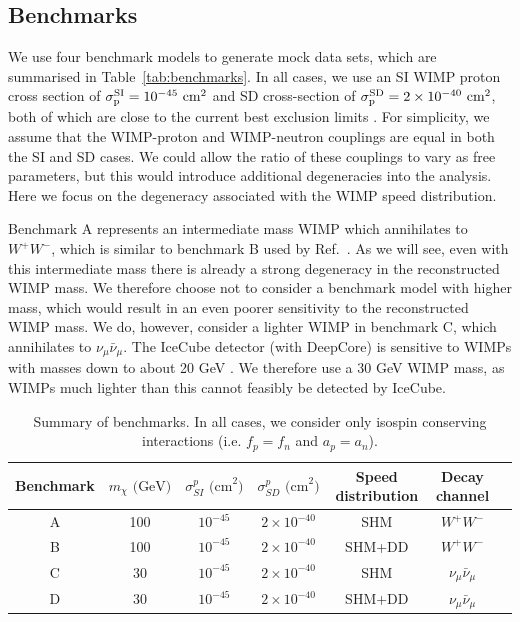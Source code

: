 \subsection{Benchmarks}
\label{sec:NT:benchmarks}
We use four benchmark models to generate mock data sets, which are summarised in Table~\ref{tab:benchmarks}. In all cases, we use an SI WIMP proton cross section of $\sigmapsi = 10^{-45} \textrm{ cm}^2$ and SD cross-section of $\sigmapsd = 2 \times 10^{-40} \textrm{ cm}^2$, both of which are close to the current best exclusion limits \cite{Akerib:2014, Aprile:2013}. For simplicity, we assume that the WIMP-proton and WIMP-neutron couplings are equal in both the SI and SD cases. We could allow the ratio of these couplings to vary as free parameters, but this would introduce additional degeneracies into the analysis. Here we focus on the degeneracy associated with the WIMP speed distribution.

Benchmark A represents an intermediate mass WIMP which annihilates to $W^{+}W^{-}$, which is similar to benchmark B used by Ref.~\cite{Arina:2013}. As we will see, even with this intermediate mass there is already a strong degeneracy in the reconstructed WIMP mass. We therefore choose not to consider a benchmark model with higher mass, which would result in an even poorer sensitivity to the reconstructed WIMP mass. We do, however, consider a lighter WIMP in benchmark C, which annihilates to $\nu_\mu \bar{\nu}_\mu$. The IceCube detector (with DeepCore) is sensitive to WIMPs with masses down to about 20 GeV \cite{}. We therefore use a 30 GeV WIMP mass, as WIMPs much lighter than this cannot feasibly be detected by IceCube.

\begin{table}[t]
  \setlength{\extrarowheight}{3pt}
  \begin{center}
	\begin{tabular}{ccccccc}
        \hline\hline
	Benchmark & $m_\chi \textrm{ (GeV)}$ & $\sigma^p_{SI} \textrm{ (cm}^2\textrm{)}$ & $\sigma^p_{SD} \textrm{ (cm}^2\textrm{)}$ & Speed distribution & Decay channel \\
	\hline
        A & 100 & $10^{-45}$ & $2 \times 10^{-40}$ & SHM & $W^{+}W^{-}$ \\
        B & 100 & $10^{-45}$ & $2 \times 10^{-40}$ & SHM+DD & $W^{+}W^{-}$ \\
        C & 30  & $10^{-45}$ & $2 \times 10^{-40}$ & SHM & $\nu_\mu \bar{\nu}_\mu$ \\
        D & 30  & $10^{-45}$ & $2 \times 10^{-40}$ & SHM+DD & $\nu_\mu \bar{\nu}_\mu$ \\
        \hline\hline
	\end{tabular}
  \end{center}
\label{tab:NT:benchmarks}
\caption[Summary of benchmarks used in Chapter~\ref{ch:NT}]{Summary of benchmarks. In all cases, we consider only isospin conserving interactions (i.e. $f_p = f_n$ and $a_p = a_n$).}
\end{table}

